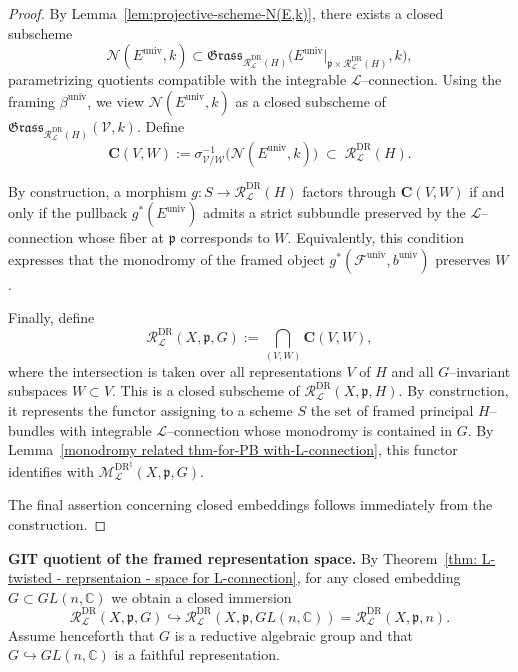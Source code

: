 \documentclass[12pt,reqno]{amsart}
\numberwithin{equation}{subsection}
\theoremstyle{definition}
\theoremstyle{theorem}
\begin{document}
\begin{proof}
	By Lemma~\eqref{lem:projective-scheme-N(E,k)}, there exists a
	closed subscheme
	\[
	\mathcal{N}(E^{\mathrm{univ}},k)
	\subset
	\mathfrak{Grass}_{\mathcal{R}^{\text{DR}}_{\mathcal{L}}(H)}
	\bigl(E^{\mathrm{univ}}|_{\mathfrak{p}\times
		\mathcal{R}^{\text{DR}}_{\mathcal{L}}(H)}, k\bigr),
	\]
	parametrizing quotients compatible with the integrable
	$\mathcal{L}$--connection.
	Using the framing $\beta^{\mathrm{univ}}$, we view
	$\mathcal{N}(E^{\mathrm{univ}},k)$ as a closed subscheme of
	$\mathfrak{Grass}_{\mathcal{R}^{\text{DR}}_{\mathcal{L}}(H)}(\mathcal{V},k)$.
	Define
	\[
	\mathbf{C}(V,W)
	:=
	\sigma_{\mathcal{V}/\mathcal{W}}^{-1}
	\bigl(\mathcal{N}(E^{\mathrm{univ}},k)\bigr)
	\;\subset\;
	\mathcal{R}^{\text{DR}}_{\mathcal{L}}(H).
	\]
	
	By construction, a morphism $g \colon S \to \mathcal{R}^{\text{DR}}_{\mathcal{L}}(H)$ factors
	through $\mathbf{C}(V,W)$ if and only if the pullback
	$g^{*}(E^{\mathrm{univ}})$ admits a strict subbundle preserved by the
	$\mathcal{L}$--connection whose fiber at $\mathfrak{p}$ corresponds to $W$.
	Equivalently, this condition expresses that the monodromy of the framed object
	$g^{*}(\mathcal{F}^{\mathrm{univ}}, b^{\mathrm{univ}})$ preserves $W$.
	
	Finally, define
	\[
	\mathcal{R}^{\text{DR}}_{\mathcal{L}}(X,\mathfrak{p},G)
	:=
	\bigcap_{(V,W)} \mathbf{C}(V,W),
	\]
	where the intersection is taken over all representations $V$ of $H$ and all $G$--invariant subspaces $W \subset V$.
	This is a closed subscheme of
	$\mathcal{R}^{\text{DR}}_{\mathcal{L}}(X,\mathfrak{p},H)$.
	By construction, it represents the functor assigning to a scheme $S$ the set of framed principal $H$--bundles with integrable $\mathcal{L}$--connection whose monodromy is contained in $G$.
	By Lemma~\eqref{monodromy related thm-for-PB with-L-connection}, this functor identifies with $\mathcal{M}^{\text{DR}^{\natural}}_{\mathcal{L}}(X,\mathfrak{p},G)$.
	
	The final assertion concerning closed embeddings follows immediately from the
	construction.
\end{proof}

\medskip

\noindent\textbf{GIT quotient of the framed representation space.}
By Theorem~\ref{thm: L-twisted - reprsentaion - space for L-connection}, for any
closed embedding $G \subset GL(n,\mathbb{C})$ we obtain a closed immersion
\[
\mathcal{R}^{\text{DR}}_{\mathcal{L}}(X,\mathfrak{p},G)
\hookrightarrow
\mathcal{R}^{\text{DR}}_{\mathcal{L}}(X,\mathfrak{p},GL(n,\mathbb{C}))
=
\mathcal{R}^{\text{DR}}_{\mathcal{L}}(X,\mathfrak{p},n).
\]
Assume henceforth that $G$ is a reductive algebraic group and that
$G \hookrightarrow GL(n,\mathbb{C})$ is a faithful representation.
\end{document}
